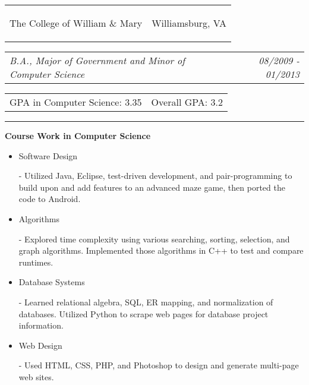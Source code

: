 \documentclass[11pt]{article}
\makeatletter
\newcommand{\headerrow}[2]
{\begin{tabular*}{\linewidth}{l@{\extracolsep{\fill}}r}
	#1 &
	#2 \\
\end{tabular*}}
\makeatother
\begin{document}
\vspace{0.4em}

\headerrow
	{\begin{Large}The College of William \& Mary\end{Large}}
	{Williamsburg, VA}
\headerrow
	{\textit{B.A., Major of Government and Minor of Computer Science}} 
	{\textit{08/2009 - 01/2013}}
\headerrow
	{GPA in Computer Science: 3.35}
	{Overall GPA: 3.2}

\vspace{0.3em}
\hrule
\vspace{0.7em}

\begin{LARGE}
	\bf Course Work in Computer Science
\end{LARGE}

\vspace{-0.4em}

\begin{itemize}
	\item \begin{large}\begin{bf}Software Design\end{bf}\end{large} - Utilized Java, Eclipse, test-driven development, and pair-programming to build upon and add features to an advanced maze game, then ported the code to Android.
	\vspace{-1.8em}
	\item \begin{large}\begin{bf}Algorithms\end{bf}\end{large} - Explored time complexity using various searching, sorting, selection, and graph algorithms. Implemented those algorithms in C++ to test and compare runtimes.
	\vspace{-0.5em}
	\item \begin{large}\begin{bf}Database Systems\end{bf}\end{large} - Learned relational algebra, SQL, ER mapping, and normalization of databases. Utilized Python to scrape web pages for database project information.
	\vspace{-0.5em}
	\item \begin{large}\begin{bf}Web Design\end{bf}\end{large} - Used HTML, CSS, PHP, and Photoshop to design and generate multi-page web sites.
\end{itemize}
\end{document}

